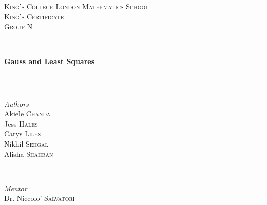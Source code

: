 \begin{titlepage} %
	\newcommand{\HRule}{\rule{\linewidth}{0.5mm}} %
	
	\center %
	
	
	\textsc{\LARGE King's College London Mathematics School}\\[1.5cm] %
	
	\textsc{\Large King's Certificate}\\[0.5cm] %
	
	\textsc{\large Group N}\\[0.5cm] %
	
	
	\HRule\\[0.7cm]
	
	{\huge\bfseries Gauss and Least Squares}\\[0.4cm] %
	
	\HRule\\[1.5cm]
	
	
	\begin{minipage}{0.4\textwidth}
		\begin{flushleft}
			\large
			\textit{Authors}\\
			Akiele \textsc{Chanda} \\
			Jess \textsc{Hales} \\
			Carys \textsc{Liles} \\
			Nikhil \textsc{Sehgal} \\
			Alisha \textsc{Shahban}
		\end{flushleft}
	\end{minipage}
	~
	\begin{minipage}{0.4\textwidth}
		\begin{flushright}
			\large
			\textit{Mentor}\\
			Dr. Niccolo' \textsc{Salvatori} \\
		\end{flushright}
	\end{minipage}
	

\end{titlepage}
